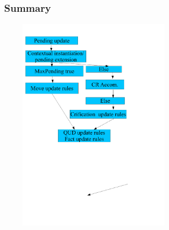 \documentclass{beamer}
\begin{document}
\begin{frame}\frametitle{Summary}

\includegraphics[height=9cm,width=8cm]{flow2.pdf}

\end{frame}





\end{document}
